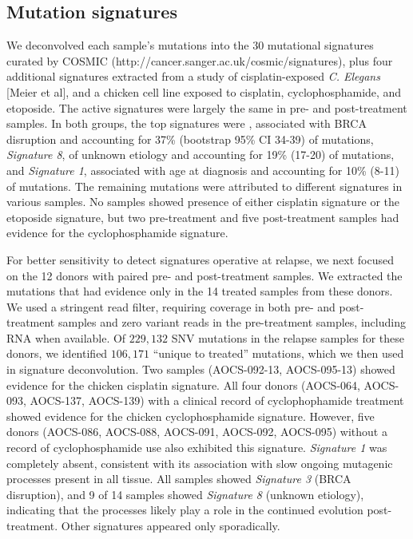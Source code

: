 
\subsection*{Mutation signatures}
We deconvolved each sample's mutations into the 30 mutational signatures curated by COSMIC (http://cancer.sanger.ac.uk/cosmic/signatures), plus four additional signatures extracted from a study of cisplatin-exposed \textit{C. Elegans} [Meier et al], and a chicken cell line exposed to cisplatin, cyclophosphamide, and etoposide\cite{Szikriszt_2016}. The active signatures were largely the same in pre- and post-treatment samples. In both groups, the top signatures were , associated with BRCA disruption and accounting for 37\% (bootstrap 95\% CI 34-39) of mutations, \textit{Signature 8}, of unknown etiology and accounting for 19\% (17-20) of mutations, and \textit{Signature 1}, associated with age at diagnosis and accounting for 10\% (8-11) of mutations. The remaining mutations were attributed to different signatures in various samples. No samples showed presence of either cisplatin signature or the etoposide signature, but two pre-treatment and five post-treatment samples had evidence for the cyclophosphamide signature.

For better sensitivity to detect signatures operative at relapse, we next focused on the 12 donors with paired pre- and post-treatment samples. We extracted the mutations that had evidence only in the 14 treated samples from these donors. We used a stringent read filter, requiring coverage in both pre- and post-treatment samples and zero variant reads in the pre-treatment samples, including RNA when available. Of $229,132$ SNV mutations in the relapse samples for these donors, we identified $106,171$ ``unique to treated'' mutations, which we then used in signature deconvolution. Two samples (AOCS-092-13, AOCS-095-13) showed evidence for the chicken cisplatin signature. All four donors (AOCS-064, AOCS-093, AOCS-137, AOCS-139) with a clinical record of cyclophophamide treatment showed evidence for the chicken cyclophosphamide signature. However, five donors (AOCS-086, AOCS-088, AOCS-091, AOCS-092, AOCS-095) without a  record of cyclophosphamide use also exhibited this signature. \textit{Signature 1} was completely absent, consistent with its association with slow ongoing mutagenic processes present in all tissue. All samples showed \textit{Signature 3} (BRCA disruption), and 9 of 14 samples showed \textit{Signature 8} (unknown etiology), indicating that the processes likely play a role in the continued evolution post-treatment. Other signatures appeared only sporadically.


